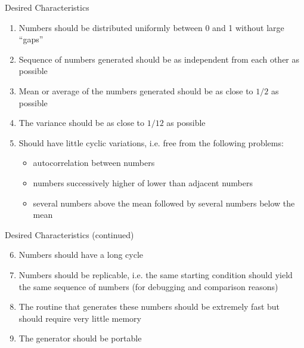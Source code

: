 \documentclass[xcolor=x11names,compress]{beamer}
\renewcommand{\(}{\begin{columns}}
\renewcommand{\)}{\end{columns}}
\newcommand{\<}[1]{\begin{column}{#1}}
\renewcommand{\>}{\end{column}}
\begin{document}
\begin{frame}{Desired Characteristics}

\begin{enumerate}
\item Numbers should be distributed uniformly between 0 and 1 without large ``gaps''
\item Sequence of numbers generated should be as independent from each other as possible
\item Mean or average of the numbers generated should be as close to $1/2$ as possible
\item The variance should be as close to $1/12$ as possible
\item Should have little cyclic variations, i.e. free from the following problems:
\begin{itemize}
\item autocorrelation between numbers
\item numbers successively higher of lower than adjacent numbers
\item several numbers above the mean followed by several numbers below the mean
\end{itemize}
\end{enumerate}

\end{frame}
\begin{frame}{Desired Characteristics (continued)}
\begin{enumerate}
\setcounter{enumi}{5}
\item Numbers should have a long cycle
\item Numbers should be replicable, i.e. the same starting condition should yield the same sequence of numbers (for debugging and comparison reasons)
\item The routine that generates these numbers should be extremely fast but should require very little memory
\item The generator should be portable
\end{enumerate}  	
\end{frame}
\end{document}
